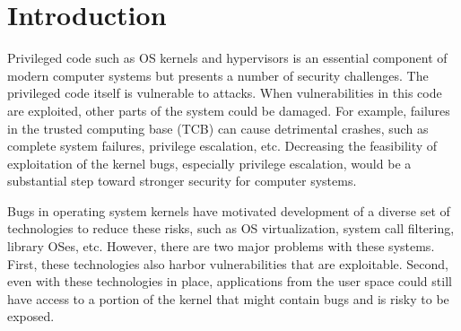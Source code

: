 \section{Introduction}
\label{sec.introduction}


Privileged code such as OS kernels and hypervisors is an essential 
component of modern computer systems but 
presents a number of security challenges. The privileged code itself is vulnerable 
to attacks. When vulnerabilities in this code are exploited, other parts 
of the system could be damaged.
For example, failures in the trusted computing base (TCB) can cause detrimental crashes, 
such as complete system failures, privilege escalation, etc. 
Decreasing the feasibility of exploitation of the kernel bugs, especially privilege escalation, 
would be a substantial step toward stronger security for computer systems.

Bugs in operating system kernels have motivated development of a diverse set of
technologies to reduce these risks, such as OS virtualization, 
system call filtering, library OSes, etc. However, there are two
major problems with these systems.  First, these technologies 
also harbor vulnerabilities that are exploitable.  Second,
even with these technologies in place, applications from the user space 
could still have access to a portion of the kernel that might contain 
bugs and is risky to be exposed. 

